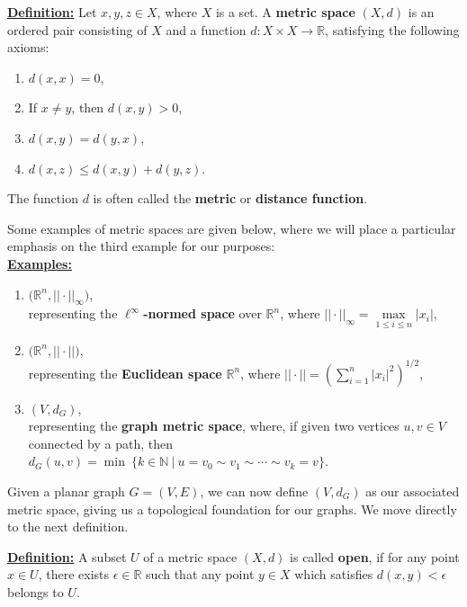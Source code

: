 \documentclass{article}
\begin{document}
\begin{graybox}
\noindent\underline{\textbf{Definition:}} Let $x,y,z\in X$, where $X$ is a set. A \textbf{metric space} $(X,d)$ is an ordered pair consisting of $X$ and a function $d:X\times X\to \mathbb{R}$, satisfying the following axioms:
\begin{enumerate}[label=(\roman*)]
  \item $d(x,x) = 0$,
  \item If $x\neq y$, then $d(x,y)>0$,
  \item $d(x,y) = d(y,x)$,
  \item $d(x,z) \leq d(x,y) + d(y,z)$.
\end{enumerate}
The function $d$ is often called the \textbf{metric} or \textbf{distance function}.
\end{graybox}

\noindent Some examples of metric spaces are given below, where we will place a particular emphasis on the third example for our purposes:\\

\noindent\underline{\textbf{Examples:}}
\begin{enumerate}[label=(\roman*)]
    \item
        $\bigl(\mathbb{R}^{n}, ||\cdot||_{\infty}\bigr)$,\\
        
        representing the \textbf{$\ell^{\infty}$-normed space} over $\mathbb{R}^{n}$, where $||\cdot||_{\infty} = \max\limits_{1\leq i\leq n}|x_{i}|$,
    \item
        $\bigl(\mathbb{R}^{n}, ||\cdot||\bigr)$,\\
        representing the \textbf{Euclidean space} $\mathbb{R}^{n}$, where $||\cdot|| =\left( \displaystyle\sum_{i=1}^n |x_i|^2 \right)^{1/2}$,
    \item
        $(V, d_{G})$,\\

        representing the \textbf{graph metric space}, where, if given two vertices $u,v\in V$ connected by a path, then\\ $d_{G}(u,v) = \min\:\{k\in\mathbb{N}\:|\:u=v_{0}\sim v_{1}\sim\cdots\sim v_{k}=v\}$.
\end{enumerate}
Given a planar graph $G = (V,E)$, we can now define $(V, d_{G})$ as our associated metric space, giving us a topological foundation for our graphs. We move directly to the next definition.\\

\begin{graybox}
\noindent\underline{\textbf{Definition:}} A subset $U$ of a metric space $(X, d)$ is called \textbf{open}, if for any point $x\in U$, there exists $\epsilon\in \mathbb{R}$ such that any point $y\in X$ which satisfies $d(x,y)<\epsilon$ belongs to $U$.
\end{graybox}
\end{document}
